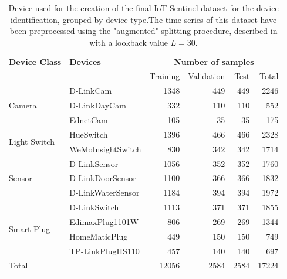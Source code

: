 \begin{table}[h]
\centering
\begin{tabular}{llrrrr}
\toprule
\textbf{Device Class} & \textbf{Devices} & \multicolumn{4}{c}{\textbf{Number of samples}} \\
& & Training & Validation & Test & Total \\
\midrule
\multirow{3}{*}{Camera}  & D-LinkCam     & 1348 & 449 & 449 & 2246  \\
                         & D-LinkDayCam  & 332 & 110 & 110 & 552  \\
                         & EdnetCam      & 105 & 35 & 35 & 175  \\
\midrule
\multirow{2}{*}{Light Switch} & HueSwitch & 1396 & 466 & 466 & 2328 \\
                             &  WeMoInsightSwitch & 830 & 342 & 342 & 1714  \\
\midrule
\multirow{3}{*}{Sensor} &  D-LinkSensor  & 1056 & 352 & 352 & 1760 \\
                         & D-LinkDoorSensor  & 1100 & 366 & 366 & 1832  \\
                         & D-LinkWaterSensor  & 1184 & 394 & 394 & 1972  \\
\midrule
\multirow{4}{*}{Smart Plug}& D-LinkSwitch  & 1113 & 371 & 371 & 1855 \\
                          & EdimaxPlug1101W & 806 & 269 & 269 & 1344  \\
                          & HomeMaticPlug & 449 & 150 & 150 & 749  \\
                          & TP-LinkPlugHS110 & 457 & 140 & 140 & 697  \\
\midrule
\midrule
Total & & 12056 & 2584 & 2584 & 17224 \\
\bottomrule
\end{tabular}
\caption{Device used for the creation of the final IoT Sentinel dataset for the device identification, grouped by device type.The time series of this dataset have been preprocessed using the "augmented" splitting procedure, described in  with a lookback value $L=30$.}\label{tab:iotdev}
\end{table}


